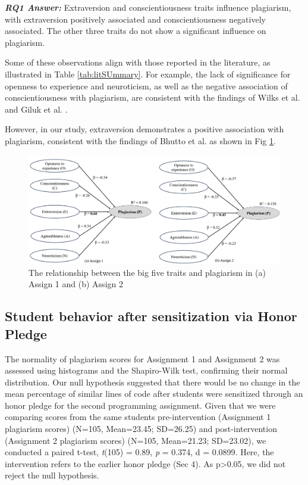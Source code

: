 \vspace{8pt}
\begin{mdframed}
\textbf{\textit{RQ1 Answer:}} Extraversion and conscientiousness traits influence plagiarism, with extraversion positively associated and conscientiousness negatively associated. The other three traits do not show a significant influence on plagiarism. 
\end{mdframed}
\vspace{8pt}

Some of these observations align with those reported in the literature, as illustrated in Table \ref{tab:litSUmmary}. For example, the lack of significance for openness to experience and neuroticism, as well as the negative association of conscientiousness with plagiarism, are consistent with the findings of Wilks et al. \cite{Wilks2016-WILPTA-3} and Giluk et al. \cite{Giluk2015BigFP}. 

However, in our study, extraversion demonstrates a positive association with plagiarism, consistent with the findings of Bhutto et al. \cite{Bhutto2019ACS} as shown in Fig \ref{fig:personalityAndPlagiarism}. 

\begin{figure}[H]
  \centering
  \includegraphics[width=\columnwidth]{1.png}
  \caption{The relationship between the big five traits and plagiarism in (a) Assign 1 and (b) Assign 2}
  \label{fig:personalityAndPlagiarism}
\end{figure}

\subsection{Student behavior after sensitization via Honor Pledge }

The normality of plagiarism scores for Assignment 1 and Assignment 2 was assessed using histograms and the Shapiro-Wilk test, confirming their normal distribution. Our null hypothesis suggested that there would be no change in the mean percentage of similar lines of code after students were sensitized through an honor pledge for the second programming assignment. Given that we were comparing scores from the same students pre-intervention (Assignment 1 plagiarism scores) (N=105, Mean=23.45; SD=26.25) and post-intervention (Assignment 2 plagiarism scores) (N=105, Mean=21.23; SD=23.02), we conducted a paired t-test, \textit{t}(105) = 0.89, \emph{p} = 0.374, d = 0.0899. Here, the intervention refers to the earlier honor pledge (Sec 4). As p>0.05, we did not reject the null hypothesis. 

